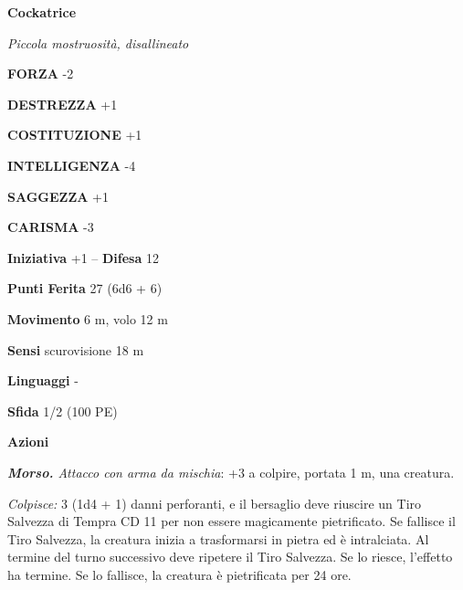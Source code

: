 \begin{multicols}{2}
\medskip{}\textbf{Cockatrice}

\emph{Piccola mostruosità, disallineato}

\textbf{FORZA} -2

\textbf{DESTREZZA} +1

\textbf{COSTITUZIONE} +1

\textbf{INTELLIGENZA} -4

\textbf{SAGGEZZA} +1

\textbf{CARISMA} -3

\textbf{Iniziativa} +1 -- \textbf{Difesa} 12

\textbf{Punti Ferita} 27 (6d6 + 6)

\textbf{Movimento} 6 m, volo 12 m

\textbf{Sensi} scurovisione 18 m

\textbf{Linguaggi} -

\textbf{Sfida} 1/2 (100 PE)

\textbf{Azioni}

\emph{\textbf{Morso.} Attacco con arma da mischia}: +3 a colpire, portata 1 m, una creatura.

\emph{Colpisce:} 3 (1d4 + 1) danni perforanti, e il bersaglio deve riuscire un Tiro Salvezza di Tempra CD 11 per non essere magicamente pietrificato. Se fallisce il Tiro Salvezza, la creatura inizia a trasformarsi in pietra ed è intralciata. Al termine del turno successivo deve ripetere il Tiro Salvezza. Se lo riesce, l'effetto ha termine. Se lo fallisce, la creatura è pietrificata per 24 ore.


\end{multicols}
